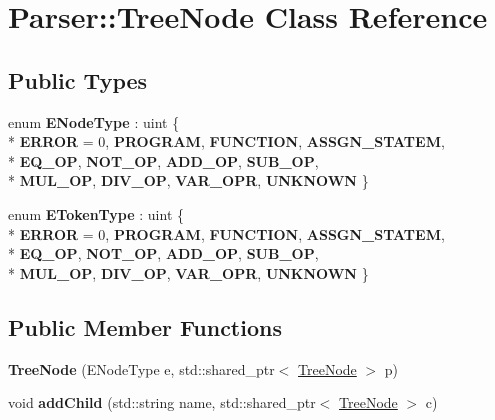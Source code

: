 \hypertarget{class_parser_1_1_tree_node}{}\section{Parser\+:\+:Tree\+Node Class Reference}
\label{class_parser_1_1_tree_node}
\subsection*{Public Types}
\begin{DoxyCompactItemize}
\item 
enum {\bfseries E\+Node\+Type} \+: uint \{ \\*
{\bfseries E\+R\+R\+OR} = 0, 
{\bfseries P\+R\+O\+G\+R\+AM}, 
{\bfseries F\+U\+N\+C\+T\+I\+ON}, 
{\bfseries A\+S\+S\+G\+N\+\_\+\+S\+T\+A\+T\+EM}, 
\\*
{\bfseries E\+Q\+\_\+\+OP}, 
{\bfseries N\+O\+T\+\_\+\+OP}, 
{\bfseries A\+D\+D\+\_\+\+OP}, 
{\bfseries S\+U\+B\+\_\+\+OP}, 
\\*
{\bfseries M\+U\+L\+\_\+\+OP}, 
{\bfseries D\+I\+V\+\_\+\+OP}, 
{\bfseries V\+A\+R\+\_\+\+O\+PR}, 
{\bfseries U\+N\+K\+N\+O\+WN}
 \}\hypertarget{class_parser_1_1_tree_node_ac4fbe01974a5f95dfc45c6deea2fd171}{}\label{class_parser_1_1_tree_node_ac4fbe01974a5f95dfc45c6deea2fd171}

\item 
enum {\bfseries E\+Token\+Type} \+: uint \{ \\*
{\bfseries E\+R\+R\+OR} = 0, 
{\bfseries P\+R\+O\+G\+R\+AM}, 
{\bfseries F\+U\+N\+C\+T\+I\+ON}, 
{\bfseries A\+S\+S\+G\+N\+\_\+\+S\+T\+A\+T\+EM}, 
\\*
{\bfseries E\+Q\+\_\+\+OP}, 
{\bfseries N\+O\+T\+\_\+\+OP}, 
{\bfseries A\+D\+D\+\_\+\+OP}, 
{\bfseries S\+U\+B\+\_\+\+OP}, 
\\*
{\bfseries M\+U\+L\+\_\+\+OP}, 
{\bfseries D\+I\+V\+\_\+\+OP}, 
{\bfseries V\+A\+R\+\_\+\+O\+PR}, 
{\bfseries U\+N\+K\+N\+O\+WN}
 \}\hypertarget{class_parser_1_1_tree_node_a8e1fc3952088b5c2b4307b6292e8ee94}{}\label{class_parser_1_1_tree_node_a8e1fc3952088b5c2b4307b6292e8ee94}

\end{DoxyCompactItemize}
\subsection*{Public Member Functions}
\begin{DoxyCompactItemize}
\item 
{\bfseries Tree\+Node} (E\+Node\+Type e, std\+::shared\+\_\+ptr$<$ \hyperlink{class_parser_1_1_tree_node}{Tree\+Node} $>$ p)\hypertarget{class_parser_1_1_tree_node_ae91b0ab18a928beb625f92fcdecd5c7b}{}\label{class_parser_1_1_tree_node_ae91b0ab18a928beb625f92fcdecd5c7b}

\item 
void {\bfseries add\+Child} (std\+::string name, std\+::shared\+\_\+ptr$<$ \hyperlink{class_parser_1_1_tree_node}{Tree\+Node} $>$ c)\hypertarget{class_parser_1_1_tree_node_a4b8435fee357fdce7876d31a935ccffd}{}\label{class_parser_1_1_tree_node_a4b8435fee357fdce7876d31a935ccffd}

\end{DoxyCompactItemize}
